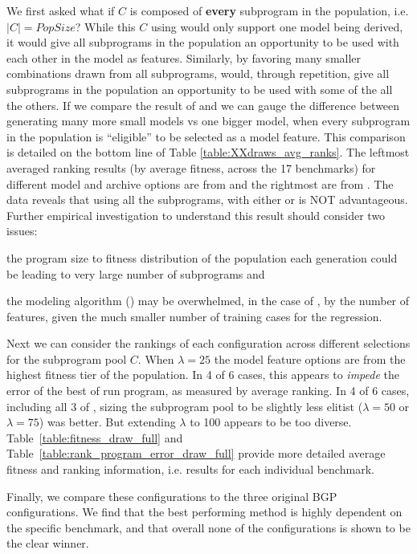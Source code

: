 We first asked what if  $C$ is composed of \textbf{every} subprogram in the population, i.e. $|C| = PopSize$?  While this $C$ using \FULL would only support one model being derived, it would give all subprograms in the population an opportunity to be used with each other in the model as features.  Similarly, by favoring many smaller combinations drawn from all subprograms, \DRAW would, through repetition,  give all subprograms in the population an opportunity to be used with some of the all the others.   If we compare the result of \DRAW and \FULL we can gauge the difference between generating many more small models vs one bigger model, when every subprogram in the population is ``eligible'' to be selected as a model feature.   This comparison is detailed on the bottom line of Table \ref{table:XXdraws_avg_ranks}. The leftmost averaged ranking results (by average fitness, across the 17 benchmarks) for different model and archive options are from \DRAW and the rightmost are from \FULL. The data reveals that using all the subprograms, with either \FULL or \DRAW is NOT advantageous. Further empirical investigation to understand this result should consider two issues: \begin{inparaenum} \item the program size to fitness distribution of the population each generation could be leading to very large number of subprograms and \item the modeling algorithm (\REPTREE) may be overwhelmed, in the case of \FULL, by the number of features, given the much smaller number of training cases for the regression. \end{inparaenum}

Next we can consider the rankings of each configuration across different selections for the subprogram pool $C$.  When $\lambda=25$ the model feature options are from the highest fitness tier of the population. In 4 of 6 cases, this appears to \textit{impede} the error of the best of run program, as measured by average ranking.  In 4 of 6 cases, including all 3 of \DRAW,  sizing the subprogram pool to be slightly less elitist ($\lambda=50$ or $\lambda=75$) was better. But extending $\lambda$ to 100 appears to be too diverse.  Table~\ref{table:fitness_draw_full} and Table~\ref{table:rank_program_error_draw_full} provide more detailed average fitness and ranking information, i.e. results for each individual benchmark.  

Finally, we compare these configurations to the three original BGP configurations.  We find that the best performing method is highly dependent on the specific benchmark, and that overall none of the configurations is shown to be the clear winner.

